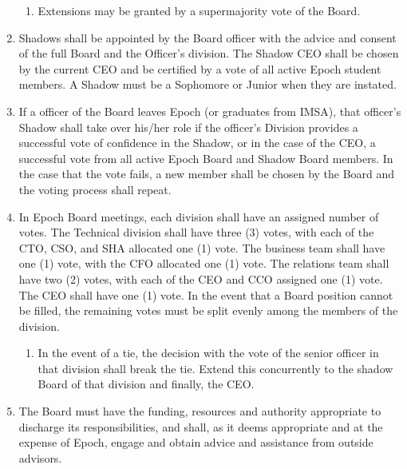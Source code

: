 \documentclass{article}
\begin{document}
\begin{enumerate}
    \begin{enumerate}
        \item Extensions may be granted by a supermajority vote of the Board.
    \end{enumerate}
    \item Shadows shall be appointed by the Board officer with the advice and consent of the full Board and the Officer's division. The Shadow CEO shall be chosen by the current CEO and be certified by a vote of all active Epoch student members. A Shadow must be a Sophomore or Junior when they are instated.
    \item If a officer of the Board leaves Epoch (or graduates from IMSA), that officer's Shadow shall take over his/her role if the officer's Division provides a successful vote of confidence in the Shadow, or in the case of the CEO, a successful vote from all active Epoch Board and Shadow Board members. In the case that the vote fails, a new member shall be chosen by the Board and the voting process shall repeat.
    \item In Epoch Board meetings, each division shall have an assigned number of votes. The Technical division shall have three (3) votes, with each of the CTO, CSO, and SHA allocated one (1) vote. The business team shall have one (1) vote, with the CFO allocated one (1) vote. The relations team shall have two (2) votes, with each of the CEO and CCO assigned one (1) vote. The CEO shall have one (1) vote. In the event that a Board position cannot be filled, the remaining votes must be split evenly among the members of the division.
    \begin{enumerate}
        \item In the event of a tie, the decision with the vote of the senior officer in that division shall break the tie. Extend this concurrently to the shadow Board of that division and finally, the CEO.
    \end{enumerate}
    \item The Board must have the funding, resources and authority appropriate to discharge its responsibilities, and shall, as it deems appropriate and at the expense of Epoch, engage and obtain advice and assistance from outside advisors. 
\end{enumerate}
\end{document}
